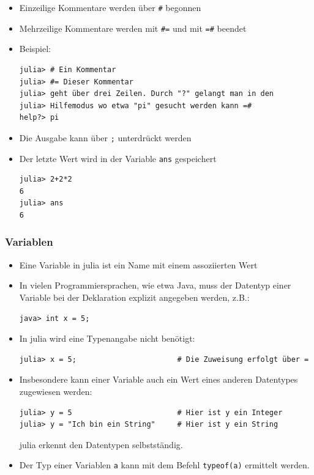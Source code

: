 \begin{frame}[fragile]
\begin{itemize}[<+->] 
\item Einzeilige Kommentare werden über \verb+#+ begonnen
\item Mehrzeilige Kommentare werden mit \verb+#=+ und mit \verb+=#+ beendet
\item Beispiel:
\begin{verbatim}
julia> # Ein Kommentar
julia> #= Dieser Kommentar
julia> geht über drei Zeilen. Durch "?" gelangt man in den
julia> Hilfemodus wo etwa "pi" gesucht werden kann =#
help?> pi
\end{verbatim}
\item Die Ausgabe kann über \verb+;+ unterdrückt werden
\item Der letzte Wert wird in der Variable \verb+ans+ gespeichert
\begin{verbatim}
julia> 2+2*2
6
julia> ans
6
\end{verbatim}
\end{itemize}
\end{frame}
\begin{frame}[fragile]
\frametitle{Variablen}
\begin{itemize}[<+->] 
\item Eine Variable in julia ist ein Name mit einem assoziierten Wert
\item In vielen Programmiersprachen, wie etwa Java, muss der Datentyp einer Variable bei der Deklaration explizit angegeben werden, z.B.:\\
\begin{verbatim}
java> int x = 5;
\end{verbatim}
\item In julia wird eine Typenangabe nicht benötigt:
\begin{verbatim}
julia> x = 5;                       # Die Zuweisung erfolgt über =
\end{verbatim}
\item Insbesondere kann einer Variable auch ein Wert eines anderen Datentypes zugewiesen werden:
\begin{verbatim}
julia> y = 5                        # Hier ist y ein Integer
julia> y = "Ich bin ein String"     # Hier ist y ein String
\end{verbatim}
julia erkennt den Datentypen selbstständig.
\item Der Typ einer Variablen \verb+a+ kann mit dem Befehl \verb+typeof(a)+ ermittelt werden.
\end{itemize}
\end{frame}

